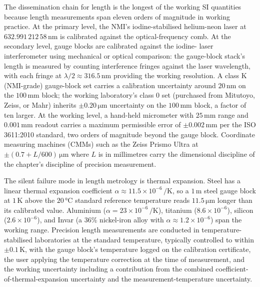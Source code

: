 The dissemination chain for length is the longest of the working SI
quantities because length measurements span eleven orders of
magnitude in working practice. At the primary level, the NMI's
iodine-stabilised helium-neon laser at $632.991\,212\,58\,\si{\nano
\meter}$ is calibrated against the optical-frequency comb. At the
secondary level, gauge blocks are calibrated against the iodine-
laser interferometer using mechanical or optical comparison: the
gauge-block stack's length is measured by counting interference
fringes against the laser wavelength, with each fringe at
$\lambda/2 \approx 316.5\,\si{\nano\meter}$ providing the working
resolution. A class K (NMI-grade) gauge-block set carries a
calibration uncertainty around $20\,\si{\nano\meter}$ on the
$100\,\si{\milli\meter}$ block; the working laboratory's
class 0 set (purchased from Mitutoyo, Zeiss, or Mahr) inherits
$\pm 0.20\,\si{\micro\meter}$ uncertainty on the $100\,\si{\milli
\meter}$ block, a factor of ten larger. At the working level, a
hand-held micrometer with $25\,\si{\milli\meter}$ range and
$0.001\,\si{\milli\meter}$ readout carries a maximum permissible
error of $\pm 0.002\,\si{\milli\meter}$ per the
ISO 3611:2010 standard, two orders of magnitude beyond the gauge
block. Coordinate measuring machines (CMMs) such as the Zeiss
Prismo Ultra at $\pm (0.7 + L/600)\,\si{\micro\meter}$ where $L$
is in millimetres carry the dimensional discipline of the chapter's
discipline of precision measurement.

The silent failure mode in length metrology is thermal expansion.
Steel has a linear thermal expansion coefficient $\alpha \approx
11.5 \times 10^{-6}\,\si{\per\kelvin}$, so a $1\,\si{\meter}$ steel
gauge block at $1\,\si{\kelvin}$ above the $20\,\si{\degreeCelsius}$
standard reference temperature reads $11.5\,\si{\micro\meter}$
longer than its calibrated value. Aluminium ($\alpha = 23 \times
10^{-6}\,\si{\per\kelvin}$), titanium ($8.6 \times 10^{-6}$),
silicon ($2.6 \times 10^{-6}$), and Invar (a 36\% nickel-iron alloy
with $\alpha \approx 1.2 \times 10^{-6}$) span the working range.
Precision length measurements are conducted in temperature-
stabilised laboratories at the standard temperature, typically
controlled to within $\pm 0.1\,\si{\kelvin}$, with the gauge block's
temperature logged on the calibration certificate, the user
applying the temperature correction at the time of measurement, and
the working uncertainty including a contribution from the
combined coefficient-of-thermal-expansion uncertainty and the
measurement-temperature uncertainty.

